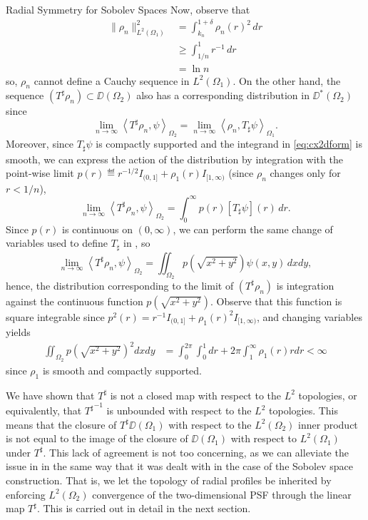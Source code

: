 \begin{chapter}{Radial Symmetry for Sobolev Spaces}
Now, observe that
\begin{align}
  \|\rho_n\|_{L^2(\Omega_1)}^2 
    &= \int_{k_n}^{1+\delta} \rho_n(r)^2\,dr \nonumber\\
    &\ge \int_{1/n}^1 r^{-1}\,dr \nonumber\\
    &= \ln n 
\end{align}
so, $\rho_n$ cannot define a Cauchy sequence in $L^2(\Omega_1)$.
On the other hand, the sequence $(T^\sharp \rho_n) \subset \DD(\Omega_2)$ also has a corresponding distribution in $\DD^*(\Omega_2)$ since
\begin{equation} \label{eq:cx2dform}
  \lim_{n\to\infty}\left\langle T^\sharp \rho_n,\psi \right\rangle_{\Omega_2} 
  = \lim_{n\to\infty}\left\langle \rho_n,T_\sharp \psi \right\rangle_{\Omega_1}.
\end{equation}
Moreover, since $T_\sharp \psi$ is compactly supported and the integrand in \eqref{eq:cx2dform} is smooth, we can express the action of the distribution by integration with the point-wise limit $p(r) \eqdef r^{-1/2}I_{(0,1]} + \rho_1(r)I_{[1,\infty)}$ (since $\rho_n$ changes only for $r<1/n$),
\begin{equation}
  \lim_{n\to\infty}\left\langle T^\sharp \rho_n,\psi \right\rangle_{\Omega_2} = \int_0^\infty p(r)[T_\sharp \psi](r)\,dr.
\end{equation}
Since $p(r)$ is continuous on $(0,\infty)$, we can perform the same change of variables used to define $T_\sharp$ in , so 
\begin{equation}
  \lim_{n\to\infty}\left\langle T^\sharp \rho_n,\psi \right\rangle_{\Omega_2} = \iint_{\Omega_2} p\left(\sqrt{x^2+y^2}\right)\psi(x,y)\,dxdy,
\end{equation}
hence, the distribution corresponding to the limit of $(T^\sharp \rho_n)$ is integration against the continuous function $p\left(\sqrt{x^2+y^2}\right)$.
Observe that this function is square integrable since $p^2(r) = r^{-1}I_{(0,1]} + \rho_1(r)^2I_{[1,\infty)}$, and changing variables yields
\begin{align}
  \iint_{\Omega_2} p\left(\sqrt{x^2+y^2}\right)^2 dxdy 
  &= \int_0^{2\pi}\int_0^1dr + 2\pi \int_1^\infty \rho_1(r)rdr <\infty
\end{align} 
since $\rho_1$ is smooth and compactly supported.

We have shown that $T^\sharp$ is not a closed map with respect to the $L^2$ topologies, or equivalently, that ${T^\sharp}^{-1}$ is unbounded with respect to the $L^2$ topologies.
This means that the closure of $T^\sharp \DD(\Omega_1)$ with respect to the $L^2(\Omega_2)$ inner product is not equal to the image of the closure of $\DD(\Omega_1)$ with respect to $L^2(\Omega_1)$ under $T^\sharp$. 
This lack of agreement is not too concerning, as we can alleviate the issue in in the same way that it was dealt with in the case of the Sobolev space construction.
That is, we let the topology of radial profiles be inherited by enforcing $L^2(\Omega_2)$ convergence of the two-dimensional PSF through the linear map $T^\sharp$.
This is carried out in detail in the next section.


\end{chapter}
